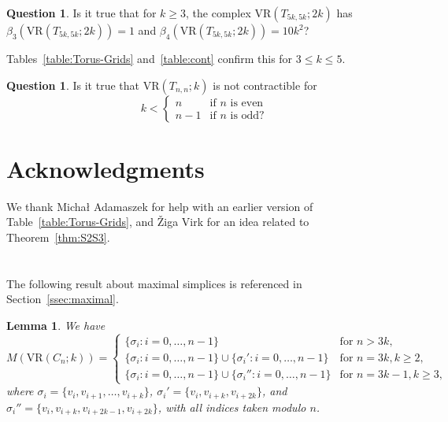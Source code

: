 \documentclass[12pt,a4paper]{amsart}
\newtheorem{lemma}[theorem]{Lemma}
\theoremstyle{definition}
\newtheorem{question}[theorem]{Question}
\newcommand{\vr}[2]{\mathrm{VR}(#1;#2)}
\numberwithin{equation}{section}
\begin{document}
\begin{question}
Is it true that for $k\geq 3$, the complex $\vr{T_{5k,5k}}{2k}$ has $\beta_3(\vr{T_{5k,5k}}{2k})=1$ and $\beta_4(\vr{T_{5k,5k}}{2k})=10k^2$?

Tables~\ref{table:Torus-Grids} and~\ref{table:cont} confirm this for $3\le k\le 5$.
\end{question}

\begin{question}
Is it true that $\vr{T_{n,n}}{k}$ is not contractible for
\[
k <
\begin{cases}
n & \text{if }n\text{ is even} \\
n-1 & \text{if }n\text{ is odd?}
\end{cases}
\]
\end{question}




\section{Acknowledgments}
We thank Micha{\l} Adamaszek for help with an earlier version of Table~\ref{table:Torus-Grids}, and \v{Z}iga Virk for an idea related to Theorem~\ref{thm:S2S3}.







\appendix
\section{}

The following result about maximal simplices is referenced in Section~\ref{ssec:maximal}.

\begin{lemma}
\label{lemma:appendix}
We have
\[
M(\vr{C_{n}}{k}) = 
\begin{cases}
\{\sigma_i: i=0, \ldots, n-1\} &\text{for }n>3k, \\
\{\sigma_i:i=0, \ldots, n-1\} \cup \{\sigma_i': i=0, \ldots, n-1\} &\text{for }n=3k, k\geq 2, \\
\{\sigma_i:i=0, \ldots, n-1\} \cup \{\sigma_i'': i=0, \ldots, n-1\} &\text{for }n=3k-1, k\geq 3,
\end{cases}
\]
where  $\sigma_i=\{v_i, v_{i+1},\ldots, v_{i+k}\}$,  $\sigma_i'=\{v_i, v_{i+k}, v_{i+2k}\}$,  and $\sigma_i''=\{v_i, v_{i+k}, v_{i+2k-1}, v_{i+2k}\}$, with all indices taken modulo $n$.
\end{lemma}
\end{document}
